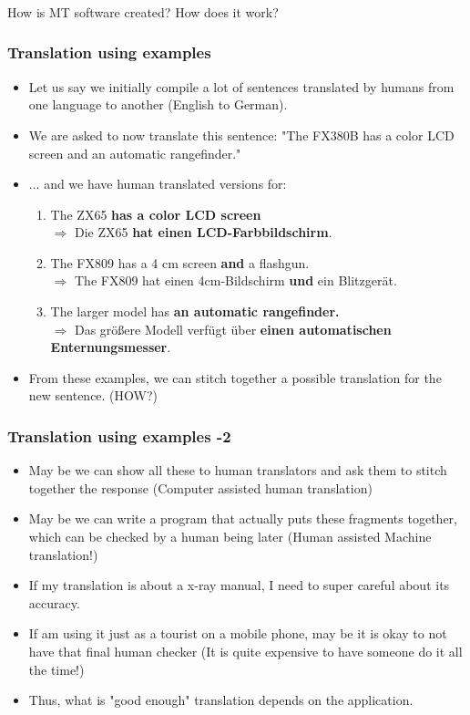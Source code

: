 \documentclass{beamer}
\begin{document}
\begin{frame}
\frametitle{}
\centering
\Large How is MT software created? How does it work?
\end{frame}

\begin{frame}
\frametitle{Translation using examples}
\begin{itemize}
\item Let us say we initially compile a lot of sentences translated by humans from one language to another (English to German). \pause
\item We are asked to now translate this sentence: "The FX380B has a color LCD screen and an automatic rangefinder."
\item ... and we have human translated versions for:
\begin{enumerate}
\item The ZX65 \textbf{has a color LCD screen}
\\ $\Rightarrow$ Die ZX65 \textbf{hat einen LCD-Farbbildschirm}.
\item The FX809 has a 4 cm screen \textbf{and} a flashgun.
\\ $\Rightarrow$ The FX809 hat einen 4cm-Bildschirm \textbf{und} ein Blitzgerät.
\item The larger model has \textbf{an automatic rangefinder.}
\\ $\Rightarrow$ Das größere Modell verfügt über \textbf{einen automatischen Enternungsmesser}.
\end{enumerate}
\item From these examples, we can stitch together a possible translation for the new sentence. (HOW?)
\end{itemize}
\end{frame}

\begin{frame}
\frametitle{Translation using examples -2}
\begin{itemize}
\item May be we can show all these to human translators and ask them to stitch together the response (Computer assisted human translation) \pause
\item May be we can write a program that actually puts these fragments together, which can be checked by a human being later (Human assisted Machine translation!) \pause
\item If my translation is about a x-ray manual, I need to super careful about its accuracy.
\item If am using it just as a tourist on a mobile phone, may be it is okay to not have that final human checker (It is quite expensive to have someone do it all the time!) \pause
\item Thus, what is "good enough" translation depends on the application.
\end{itemize}
\end{frame}
\end{document}
